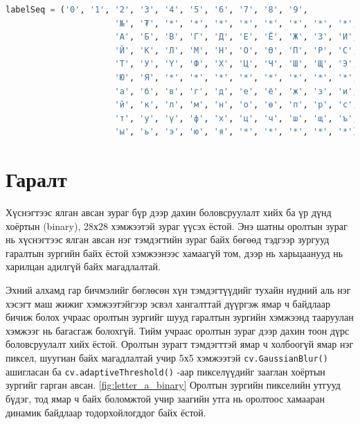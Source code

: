 \begin{lstlisting}[caption={Хамгийн эхний маягтын хувилбарын нүднүүд, тэдгээрт харгалзах тэмдэгтүүдийн дараалал}, label={lst:sheet_1_label_seq}, language=Python]
labelSeq = ('0', '1', '2', '3', '4', '5', '6', '7', '8', '9', 
					  '№', '₮', '*', '*', '*', '*', '*', '*', '*', '*', 
					  'А', 'Б', 'В', 'Г', 'Д', 'Е', 'Ё', 'Ж', 'З', 'И', 
					  'Й', 'К', 'Л', 'М', 'Н', 'О', 'Ө', 'П', 'Р', 'С', 
					  'Т', 'У', 'Ү', 'Ф', 'Х', 'Ц', 'Ч', 'Ш', 'Щ', 'Э', 
					  'Ю', 'Я', '*', '*', '*', '*', '*', '*', '*', '*', 
					  'а', 'б', 'в', 'г', 'д', 'е', 'ё', 'ж', 'з', 'и', 
					  'й', 'к', 'л', 'м', 'н', 'о', 'ө', 'п', 'р', 'с',
					  'т', 'у', 'ү', 'ф', 'х', 'ц', 'ч', 'ш', 'щ', 'ъ', 
					  'ы', 'ь', 'э', 'ю', 'я', '*', '*', '*', '*', '*')
\end{lstlisting}

\section{Гаралт}

Хүснэгтээс ялган авсан зураг бүр дээр дахин боловсруулалт хийх ба үр дүнд хоёртын (binary), 28х28 хэмжээтэй зураг үүсэх ёстой. Энэ шатны оролтын зураг нь хүснэгтээс ялган авсан нэг тэмдэгтийн зураг байх бөгөөд тэдгээр зургууд гаралтын зургийн байх ёстой хэмжээнээс хамаагүй том, дээр нь харьцаанууд нь харилцан адилгүй байх магадлалтай.

Эхний алхамд гар бичмэлийг бөглөсөн хүн тэмдэгтүүдийг тухайн нүдний аль нэг хэсэгт маш жижиг хэмжээтэйгээр эсвэл хангалттай дүүргэж ямар ч байдлаар бичиж болох учраас оролтын зургийг шууд гаралтын зургийн хэмжээнд тааруулан хэмжээг нь багасгаж болохгүй. Тийм учраас оролтын зураг дээр дахин тоон дүрс боловсруулалт хийх ёстой. Оролтын зурагт тэмдэгттэй ямар ч холбоогүй ямар нэг пиксел, шуугиан байх магадлалтай учир 5х5 хэмжээтэй \texttt{cv.GaussianBlur()} ашигласан ба \texttt{cv.adaptiveThreshold()} -аар пикселүүдийг зааглан хоёртын зургийг гарган авсан. \ref{fig:letter_a_binary} Оролтын зургийн пикселийн утгууд бүдэг, тод ямар ч байх боломжтой учир заагийн утга нь оролтоос хамааран динамик байдлаар тодорхойлогддог байх ёстой.


